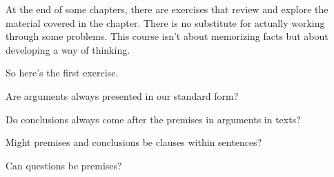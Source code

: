 \begin{practiceproblems}

At the end of some chapters, there are exercises that review and
explore the material covered in the chapter.
There is no substitute for actually working through some problems. This course isn't about memorizing facts but about developing a way of thinking.

So here’s the first exercise.
\problempart

\begin{earg}
\item Are arguments always presented in our standard form?
\item Do conclusions always come after the premises in arguments in texts?
\item Might premises and conclusions be clauses within sentences?
\item Can questions be premises?
\end{earg}


\end{practiceproblems}
